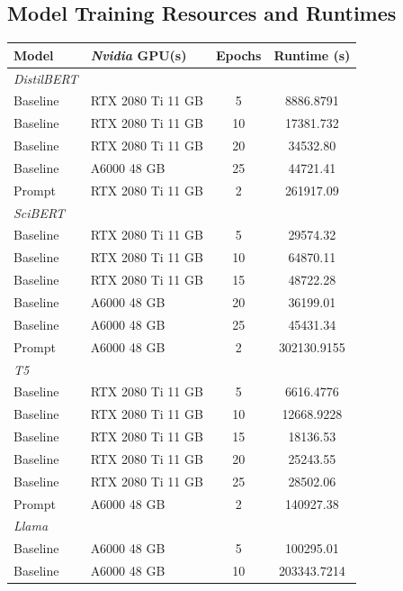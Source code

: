 \subsection{Model Training Resources and Runtimes}
\begin{table}[h]
    \centering
    \begin{tabular}{l l c c}
        \hline
        \textbf{Model}  & \textbf{\textit{Nvidia} GPU(s)} & \textbf{Epochs} & \textbf{Runtime (s)} \\
        \hline
        \textit{DistilBERT} & & & \\
        Baseline & RTX 2080 Ti 11 GB & 5 & 8886.8791 \\
        Baseline & RTX 2080 Ti 11 GB & 10 & 17381.732 \\
        Baseline & RTX 2080 Ti 11 GB & 20 & 34532.80 \\
        Baseline & A6000 48 GB & 25 & 44721.41 \\
        Prompt & RTX 2080 Ti 11 GB & 2 & 261917.09 \\
        \hline
        \textit{SciBERT} & & & \\
        Baseline & RTX 2080 Ti 11 GB & 5 & 29574.32 \\
        Baseline & RTX 2080 Ti 11 GB & 10 & 64870.11 \\
        Baseline & RTX 2080 Ti 11 GB & 15 & 48722.28 \\
        Baseline & A6000 48 GB & 20 & 36199.01 \\
        Baseline & A6000 48 GB & 25 & 45431.34 \\
        Prompt & A6000 48 GB & 2 & 302130.9155 \\
        \hline
        \textit{T5} & & & \\
        Baseline & RTX 2080 Ti 11 GB & 5 & 6616.4776 \\
        Baseline & RTX 2080 Ti 11 GB & 10 & 12668.9228 \\
        Baseline & RTX 2080 Ti 11 GB & 15 & 18136.53 \\
        Baseline & RTX 2080 Ti 11 GB & 20 & 25243.55 \\
        Baseline & RTX 2080 Ti 11 GB & 25 & 28502.06 \\
        Prompt & A6000 48 GB & 2 & 140927.38 \\
        \hline
        \textit{Llama} & & & \\
        Baseline & A6000 48 GB & 5 & 100295.01 \\
        Baseline & A6000 48 GB & 10 & 203343.7214 \\

\end{tabular}
\end{table}
